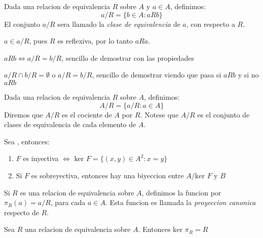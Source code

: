 \begin{definition}
  Dada una relacion de equivalencia $R$ sobre $A$ y $a \in A$, definimos:
  $$
  a / R = \{b \in A: aRb\}
  $$
  El conjunto $a/R$ sera llamado la \emph{clase de equivalencia} de $a$, con respecto a $R$.
\end{definition}

\begin{remark}
  $a \in a/R$, pues $R$ es reflexiva, por lo tanto $aRa$.
\end{remark}
\begin{remark}
  $aRb \iff a/R = b/R$, sencillo de demostrar con las
  propiedades
\end{remark}
\begin{remark}
  $a/R \cap b/R = \emptyset$ o $a/R = b/R$, sencillo de demostrar
  viendo que pasa si $aRb$ y si no $aRb$
\end{remark}

\begin{definition}
  Dada una relacion de equivalencia $R$ sobre $A$, definimos:
  $$
  A/R = \{a/R : a \in A\}
  $$
  Diremos que $A/R$ es el cociente de $A$ por $R$. Notese que $A/R$ es el conjunto de clases de equivalencia
  de cada elemento de $A$.
\end{definition}

\begin{remark}
  Sea , entonces:
  \begin{enumerate}
    \item $F$ es inyectiva $\iff$ ker $F = \{(x, y) \in A^2 : x = y\}$
    \item Si $F$ es sobreyectiva, entonces hay una biyeccion entre $A/\text{ker }F$ y $B$
  \end{enumerate}
\end{remark}

\begin{definition}
  Si $R$ es una relacion de equivalencia sobre $A$, definimos la funcion  por $\pi_R(a) = a/R$, para cada $a \in A$.
  Esta funcion es llamada la \emph{proyeccion canonica} respecto de $R$.
\end{definition}

\begin{remark}
  Sea $R$ una relacion de equivalencia sobre $A$. Entonces ${\text{ker } \pi_R = R}$
\end{remark}

